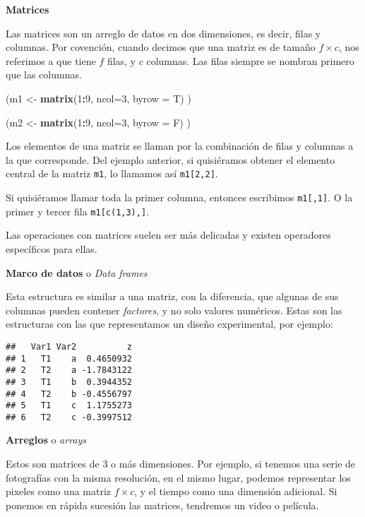 \documentclass[12pt,letterpaper,]{book}
\newenvironment{Shaded}{\begin{snugshade}}{\end{snugshade}}
\newcommand{\KeywordTok}[1]{\textcolor[rgb]{0.13,0.29,0.53}{\textbf{#1}}}
\newcommand{\DataTypeTok}[1]{\textcolor[rgb]{0.13,0.29,0.53}{#1}}
\newcommand{\DecValTok}[1]{\textcolor[rgb]{0.00,0.00,0.81}{#1}}
\newcommand{\StringTok}[1]{\textcolor[rgb]{0.31,0.60,0.02}{#1}}
\newcommand{\OperatorTok}[1]{\textcolor[rgb]{0.81,0.36,0.00}{\textbf{#1}}}
\newcommand{\NormalTok}[1]{#1}
\begin{document}
\textbf{Matrices}

Las matrices son un arreglo de datos en dos dimensiones, es decir, filas
y columnas. Por covención, cuando decimos que una matriz es de tamaño
\(f\times c\), nos referimos a que tiene \(f\) filas, y \(c\) columnas.
Las filas siempre se nombran primero que las columnas.

\begin{Shaded}
\begin{Highlighting}[]
\NormalTok{(m1 <-}\StringTok{ }\KeywordTok{matrix}\NormalTok{(}\DecValTok{1}\OperatorTok{:}\DecValTok{9}\NormalTok{, }\DataTypeTok{ncol=}\DecValTok{3}\NormalTok{, }\DataTypeTok{byrow =}\NormalTok{ T) )}

\NormalTok{(m2 <-}\StringTok{ }\KeywordTok{matrix}\NormalTok{(}\DecValTok{1}\OperatorTok{:}\DecValTok{9}\NormalTok{, }\DataTypeTok{ncol=}\DecValTok{3}\NormalTok{, }\DataTypeTok{byrow =}\NormalTok{ F) )}
\end{Highlighting}
\end{Shaded}

Los elementos de una matriz se llaman por la combinación de filas y
columnas a la que corresponde. Del ejemplo anterior, si quisiéramos
obtener el elemento central de la matriz \texttt{m1}, lo llamamos así
\texttt{m1{[}2,2{]}}.

Si quisiéramos llamar toda la primer columna, entonces escribimos
\texttt{m1{[},1{]}}. O la primer y tercer fila \texttt{m1{[}c(1,3),{]}}.

Las operaciones con matrices suelen ser más delicadas y existen
operadores específicos para ellas.

\textbf{Marco de datos} o \emph{Data frames}

Esta estructura es similar a una matriz, con la diferencia, que algunas
de sus columnas pueden contener \emph{factores}, y no solo valores
numéricos. Estas son las estructuras con las que representamos un diseño
experimental, por ejemplo:

\begin{verbatim}
##   Var1 Var2          z
## 1   T1    a  0.4650932
## 2   T2    a -1.7843122
## 3   T1    b  0.3944352
## 4   T2    b -0.4556797
## 5   T1    c  1.1755273
## 6   T2    c -0.3997512
\end{verbatim}

\textbf{Arreglos} o \emph{arrays}

Estos son matrices de 3 o más dimensiones. Por ejemplo, si tenemos una
serie de fotografías con la misma resolución, en el mismo lugar, podemos
representar los pixeles como una matriz \(f\times c\), y el tiempo como
una dimensión adicional. Si ponemos en rápida sucesión las matrices,
tendremos un video o película.
\end{document}
